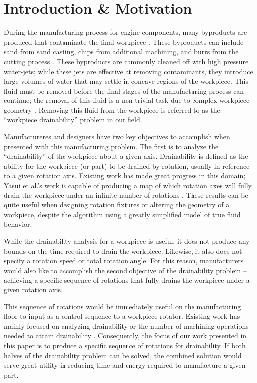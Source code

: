 							\chapter{Introduction \& Motivation}



During the manufacturing process for engine components, many byproducts are produced that contaminate the final workpiece \cite{Hancock94}. These byproducts can include sand from sand casting, chips from additional machining, and burrs from the cutting process \cite{Arbelaez}.
These byproducts are commonly cleaned off with high pressure water-jets; while these jets are effective at removing contaminants, they introduce large volumes of water that may settle in concave regions of the workpiece. This fluid must be removed before the final stages of the manufacturing process can continue; the removal of this fluid is a non-trivial task due to complex workpiece geometry \cite{Avila} \cite{Yasui2011}. Removing this fluid from the workpiece is referred to as the ``workpiece drainability'' problem in our field.

Manufactureres and designers have two key objectives to accomplish when presented with this manufacturing problem. The first is to analyze the ``drainability'' of the workpiece about a given axis. Drainability is defined as the ability for the workpiece (or part) to be drained by rotation, usually in reference to a given rotation axis. Existing work has made great progress in this domain; Yasui et al.'s work is capable of producing a map of which rotation axes will fully drain the workpiece under an infinite number of rotations \cite{Yasui2011}. These results can be quite useful when designing rotation fixtures or altering the geometry of a workpiece, despite the algorithm using a greatly simplified model of true fluid behavior.

While the drainability analysis for a workpiece is useful, it does not produce any bounds on the time required to drain the workpiece. Likewise, it also does not specify a rotation speed or total rotation angle. For this reason, manufacturers would also like to accomplish the second objective of the drainability problem -- achieving a specific sequence of rotations that fully drains the workpiece under a given rotation axis.

This sequence of rotations would be immediately useful on the manufacturing floor to input as a control sequence to a workpiece rotator. Existing work has mainly focused on analyzing drainability \cite{Yasui2011} or the number of machining operations needed to attain drainability \cite{Aloupis_draininga}. Consequently, the focus of our work presented in this paper is to produce a specific sequence of rotations for drainability. If both halves of the drainability problem can be solved, the combined solution would serve great utility in reducing time and energy required to manufacture a given part.

